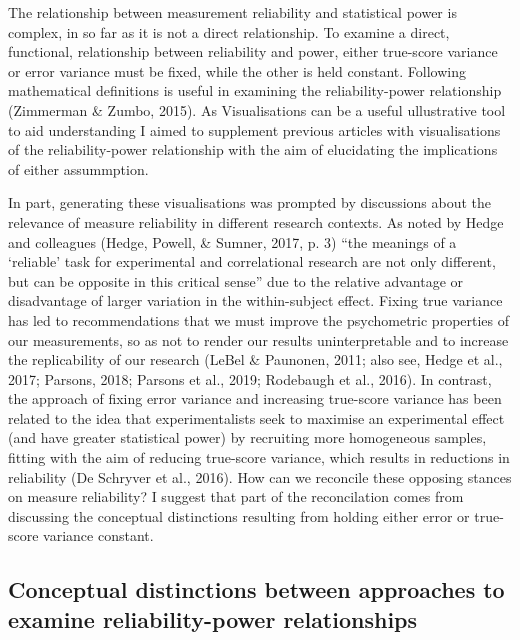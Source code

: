 \documentclass[english,,man]{apa6}
\begin{document}
The relationship between measurement reliability and statistical power is complex, in so far as it is not a direct relationship. To examine a direct, functional, relationship between reliability and power, either true-score variance or error variance must be fixed, while the other is held constant. Following mathematical definitions is useful in examining the reliability-power relationship (Zimmerman \& Zumbo, 2015). As Visualisations can be a useful ullustrative tool to aid understanding I aimed to supplement previous articles with visualisations of the reliability-power relationship with the aim of elucidating the implications of either assummption.

In part, generating these visualisations was prompted by discussions about the relevance of measure reliability in different research contexts. As noted by Hedge and colleagues (Hedge, Powell, \& Sumner, 2017, p. 3) \enquote{the meanings of a \enquote{reliable} task for experimental and correlational research are not only different, but can be opposite in this critical sense} due to the relative advantage or disadvantage of larger variation in the within-subject effect. Fixing true variance has led to recommendations that we must improve the psychometric properties of our measurements, so as not to render our results uninterpretable and to increase the replicability of our research (LeBel \& Paunonen, 2011; also see, Hedge et al., 2017; Parsons, 2018; Parsons et al., 2019; Rodebaugh et al., 2016). In contrast, the approach of fixing error variance and increasing true-score variance has been related to the idea that experimentalists seek to maximise an experimental effect (and have greater statistical power) by recruiting more homogeneous samples, fitting with the aim of reducing true-score variance, which results in reductions in reliability (De Schryver et al., 2016). How can we reconcile these opposing stances on measure reliability? I suggest that part of the reconcilation comes from discussing the conceptual distinctions resulting from holding either error or true-score variance constant.

\hypertarget{conceptual-distinctions-between-approaches-to-examine-reliability-power-relationships}{%
\subsection{Conceptual distinctions between approaches to examine reliability-power relationships}\label{conceptual-distinctions-between-approaches-to-examine-reliability-power-relationships}}
\end{document}
